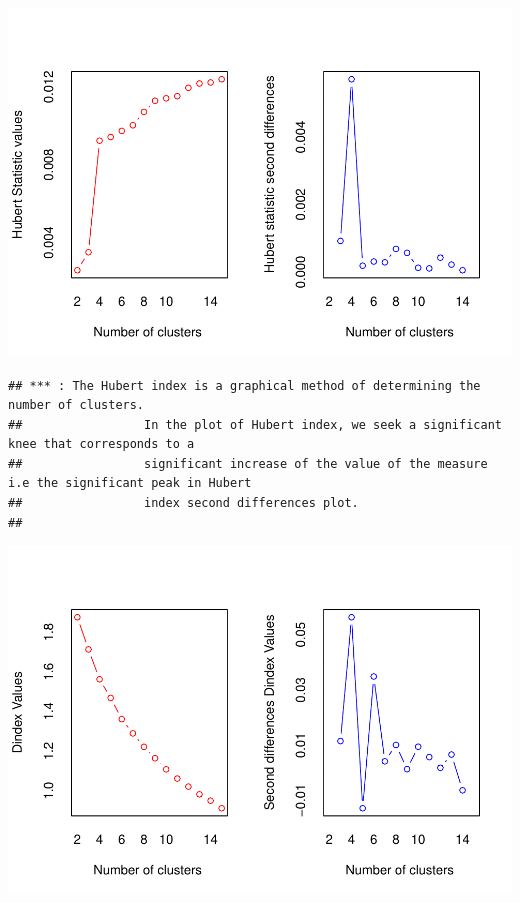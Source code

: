 \documentclass[
]{article}
\begin{document}
\includegraphics{Projet_files/figure-latex/unnamed-chunk-33-1.pdf}

\begin{verbatim}
## *** : The Hubert index is a graphical method of determining the number of clusters.
##                 In the plot of Hubert index, we seek a significant knee that corresponds to a 
##                 significant increase of the value of the measure i.e the significant peak in Hubert
##                 index second differences plot. 
## 
\end{verbatim}

\includegraphics{Projet_files/figure-latex/unnamed-chunk-33-2.pdf}
\end{document}

